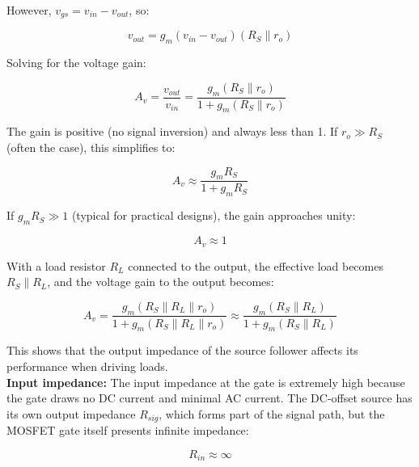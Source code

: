 \documentclass[10pt]{article}
\begin{document}
However, $v_{gs} = v_{in} - v_{out}$, so:

\begin{equation}
    v_{out} = g_m (v_{in} - v_{out}) (R_S \parallel r_o)
    \label{eq:vout_vgs}
\end{equation}

Solving for the voltage gain:

\begin{equation}
    A_v = \frac{v_{out}}{v_{in}} = \frac{g_m (R_S \parallel r_o)}{1 + g_m (R_S \parallel r_o)}
    \label{eq:av_cd}
\end{equation}

The gain is positive (no signal inversion) and always less than 1. If $r_o \gg R_S$ (often the case), this simplifies to:

\begin{equation}
    A_v \approx \frac{g_m R_S}{1 + g_m R_S}
    \label{eq:av_cd_simple}
\end{equation}

If $g_m R_S \gg 1$ (typical for practical designs), the gain approaches unity:

\begin{equation}
    A_v \approx 1
    \label{eq:av_cd_unity}
\end{equation}

With a load resistor $R_L$ connected to the output, the effective load becomes $R_S \parallel R_L$, and the voltage gain to the output becomes:

\begin{equation}
    A_v = \frac{g_m (R_S \parallel R_L \parallel r_o)}{1 + g_m (R_S \parallel R_L \parallel r_o)} \approx \frac{g_m (R_S \parallel R_L)}{1 + g_m (R_S \parallel R_L)}
    \label{eq:av_cd_loaded}
\end{equation}

This shows that the output impedance of the source follower affects its performance when driving loads. \\

\textbf{Input impedance:} The input impedance at the gate is extremely high because the gate draws no DC current and minimal AC current. The DC-offset source has its own output impedance $R_{sig}$, which forms part of the signal path, but the MOSFET gate itself presents infinite impedance:

\begin{equation}
    R_{in} \approx \infty 
    \label{eq:rin_cs}
\end{equation}
\end{document}

